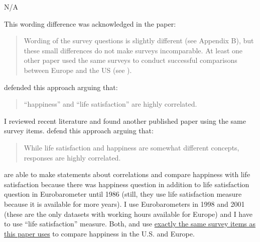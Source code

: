  N/A


 This wording difference was acknowledged in the paper:

\begin{quote}
 Wording of the
survey questions is slightly
different (see  Appendix B), but these small
differences do not make surveys
incomparable. At least one other paper used the same surveys
to conduct successful comparisons
between Europe and the US (see \citet{alesina03}). 
\end{quote}

\noindent\citet[2013/2/11]{alesina03} defended this approach arguing that:
\begin{quote}
 ``happiness'' and ``life satisfaction'' are
highly correlated. 
\end{quote}


\noindent I reviewed recent literature and found another published paper  using the same survey items. \citet[211/2/20]{stevenson09w} defend this approach arguing that:  
\begin{quote}
While life satisfaction and happiness are somewhat different
concepts, responses are highly correlated.
\end{quote}

\noindent \citet{alesina03} \citet{stevenson09w} are able to make statements about correlations and compare
happiness with life satisfaction because there was happiness question in addition to life
satisfaction question in Eurobarometer until 1986
(still, they use life satisfaction measure because it is available for more years).
I use Eurobarometers in 1998 and 2001 (these are the only datasets with working hours available
for Europe) and I have to use ``life satisfaction'' measure. Both, \citet{alesina03} and
\citet{stevenson09w} use \underline{exactly the same survey items as this paper uses} to compare
happiness in the U.S. and Europe.

